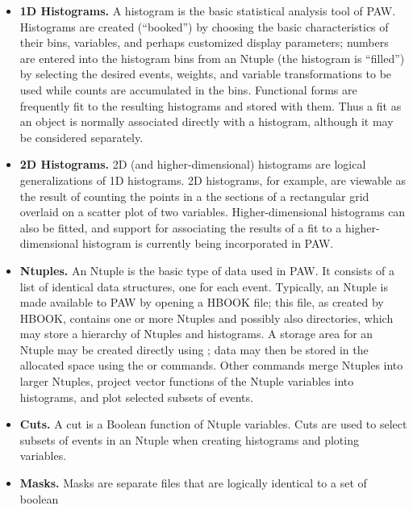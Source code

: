 \begin{itemize}
\item {\bf 1D Histograms.}  
      A histogram is the basic statistical analysis tool of PAW. Histograms are
      created (``booked'') by choosing the basic characteristics of their bins,
      variables, and perhaps customized display parameters; numbers are entered
      into the histogram bins from an Ntuple (the histogram is ``filled'') by 
      selecting the desired events, weights, and variable transformations to be
      used while counts are accumulated in the bins. Functional forms are 
      frequently fit to the resulting histograms and stored with them. Thus a 
      fit as an object is normally associated directly with a histogram, 
      although it may be considered separately.
\item {\bf 2D Histograms.}  
      2D (and higher-dimensional) histograms are logical generalizations of 1D
      histograms. 2D histograms, for example, are viewable as the result of 
      counting the points in a the sections of a rectangular grid overlaid on 
      a scatter plot of two variables. Higher-dimensional histograms can also 
      be fitted, and support for associating the results of a fit to a 
      higher-dimensional histogram is currently being incorporated in PAW.
\item {\bf Ntuples.}  
      An Ntuple is the basic type of data used in PAW. It consists of a list of
      identical data structures, one for each event. Typically, an Ntuple is 
      made available to PAW by opening a HBOOK file; this file, as created by 
      HBOOK, contains one or more Ntuples and possibly also directories, which
      may store a hierarchy of Ntuples and histograms. A storage area for an 
      Ntuple may be created directly using ; data may then
      be stored in the allocated space using the  or 
      commands. Other commands merge Ntuples into larger 
      Ntuples, project vector functions of the Ntuple variables into histograms,
      and plot selected subsets of events.
\item {\bf Cuts.}  
      A cut is a Boolean function of Ntuple variables. Cuts are used to select
      subsets of events in an Ntuple when creating histograms and ploting 
      variables.
\item {\bf Masks.}  
      Masks are separate files that are logically identical to a set of boolean 

\end{itemize}
